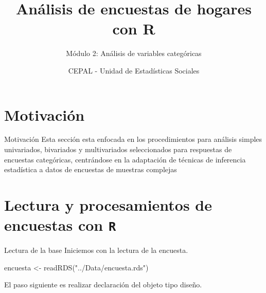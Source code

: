 \documentclass[
  ignorenonframetext,
]{beamer}
\title{Análisis de encuestas de hogares con R}
\subtitle{Módulo 2: Análisis de variables categóricas}
\author{}
\date{\vspace{-2.5em}CEPAL - Unidad de Estadísticas Sociales}
\newenvironment{Shaded}{\begin{snugshade}}{\end{snugshade}}
\newcommand{\FunctionTok}[1]{\textcolor[rgb]{0.00,0.00,0.00}{#1}}
\newcommand{\NormalTok}[1]{#1}
\newcommand{\OtherTok}[1]{\textcolor[rgb]{0.56,0.35,0.01}{#1}}
\newcommand{\StringTok}[1]{\textcolor[rgb]{0.31,0.60,0.02}{#1}}
\begin{document}
\frame{\titlepage}

\begin{frame}[allowframebreaks]
  \tableofcontents[hideallsubsections]
\end{frame}
\hypertarget{motivaciuxf3n}{%
\section{Motivación}\label{motivaciuxf3n}}

\begin{frame}{Motivación}
Esta sección esta enfocada en los procedimientos para análisis simples
univariados, bivariados y multivariados seleccionados para respuestas de
encuestas categóricas, centrándose en la adaptación de técnicas de
inferencia estadística a datos de encuestas de muestras complejas
\end{frame}

\hypertarget{lectura-y-procesamientos-de-encuestas-con-r}{%
\section{\texorpdfstring{Lectura y procesamientos de encuestas con
\texttt{R}}{Lectura y procesamientos de encuestas con R}}\label{lectura-y-procesamientos-de-encuestas-con-r}}

\begin{frame}[fragile]{Lectura de la base}
\protect\hypertarget{lectura-de-la-base}{}
Iniciemos con la lectura de la encuesta.

\begin{Shaded}
\begin{Highlighting}[]
\NormalTok{encuesta }\OtherTok{\textless{}{-}} \FunctionTok{readRDS}\NormalTok{(}\StringTok{"../Data/encuesta.rds"}\NormalTok{)}
\end{Highlighting}
\end{Shaded}

El paso siguiente es realizar declaración del objeto tipo diseño.
\end{frame}
\end{document}
